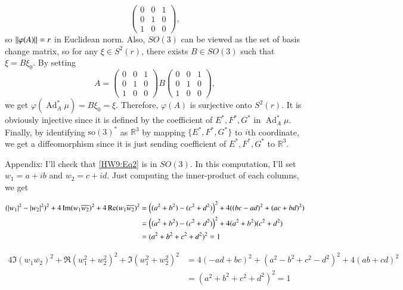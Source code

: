 \documentclass[a4paper, 12pt]{article}
\theoremstyle{Mydefinition}
\theoremstyle{Mytheorem}
\DeclareMathOperator{\Ad}{Ad}
\begin{document}
\begin{enumerate}
\begin{equation*}
\begin{pmatrix}
        0 & 0 & 1\\
        0 & 1 & 0\\
        1 & 0 & 0
    \end{pmatrix},
\end{equation*}
so $\norm{\varphi(A)} = r$ in Euclidean norm. Also, $\mathit{SO}(3)$ can be viewed as the set of basis change matrix, so for any $\xi\in S^2(r)$, there exists $B\in \mathit{SO}(3)$ such that $\xi = B\xi_0$. By setting 
\begin{equation*}
    A = \begin{pmatrix}
        0 & 0 & 1\\
        0 & 1 & 0\\
        1 & 0 & 0
    \end{pmatrix}
    B
    \begin{pmatrix}
        0 & 0 & 1\\
        0 & 1 & 0\\
        1 & 0 & 0
    \end{pmatrix},
\end{equation*}
we get $\varphi(\Ad_A^*\mu) = B\xi_0 = \xi$. Therefore, $\varphi(A)$ is surjective onto $S^2(r)$. It is obviously injective since it is defined by the coefficient of $E^*, F^*, G^*$ in $\Ad_A^*\mu$. Finally, by identifying $\mathrm{so}(3)^*$ as $\mathbb{R}^3$ by mapping $\{E^*, F^*, G^*\}$ to $i$th coordinate, we get a diffeomorphism since it is just sending coefficient of $E^*,F^*,G^*$ to $\mathbb{R}^3$.
\end{enumerate}
\newpage
Appendix: I'll check that \eqref{HW9:Eq2} is in $\mathit{SO}(3)$. In this computation, I'll set $w_1 = a+ib$ and $w_2=c+id$. Just computing the inner-product of each columns, we get

\begin{equation*}
\begin{split}
    (\abs{w_1}^2-\abs{w_2}^2)^2 + 4\Im(w_1\overline{w_2})^2  + 4\Re(w_1\overline{w_2})^2 &=\left((a^2+b^2)-(c^2+d^2)\right)^2 + 4((bc-ad)^2+(ac+bd)^2)\\ &=\left((a^2+b^2)-(c^2+d^2)\right)^2 + 4(a^2+b^2)(c^2+d^2)\\
    &=(a^2+b^2+c^2+d^2)^2 = 1
\end{split}
\end{equation*}

\begin{equation*}
\begin{split}
    4\Im(w_1\overline{w_2})^2 + \Re(w_1^2+w_2^2)^2 + \Im(w_1^2+w_2^2)^2 &= 4(-ad+bc)^2+(a^2-b^2+c^2-d^2)^2 + 4(ab+cd)^2 \\
    &=(a^2+b^2+c^2+d^2)^2 = 1
\end{split}
\end{equation*}
\end{document}
